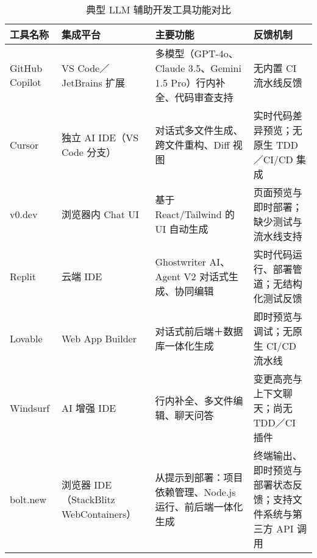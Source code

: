 \begin{table}[htbp]
  \centering
  \footnotesize
  \caption{典型 LLM 辅助开发工具功能对比}
  \label{tab:llm-tools-updated}
  \setlength{\tabcolsep}{3pt}
  \begin{tabular}{
    >{\raggedright\arraybackslash}p{2.4cm}
    >{\raggedright\arraybackslash}p{2.6cm}
    >{\raggedright\arraybackslash}p{3.6cm}
    >{\raggedright\arraybackslash}p{4.6cm}
  }
    \toprule
    \textbf{工具名称} & \textbf{集成平台} & \textbf{主要功能} & \textbf{反馈机制} \\
    \midrule
    GitHub Copilot\cite{copilotx2023}      & VS Code／JetBrains 扩展        & 多模型（GPT-4o、Claude 3.5、Gemini 1.5 Pro）行内补全、代码审查支持      & 无内置 CI 流水线反馈                                \\
    \addlinespace
    Cursor\cite{cursor2025wiki}            & 独立 AI IDE（VS Code 分支）    & 对话式多文件生成、跨文件重构、Diff 视图              & 实时代码差异预览；无原生 TDD／CI/CD 集成            \\
    \addlinespace
    v0.dev\cite{v0dev2024}                 & 浏览器内 Chat UI               & 基于 React/Tailwind 的 UI 自动生成                  & 页面预览与即时部署；缺少测试与流水线支持            \\
    \addlinespace
    Replit\cite{replit2025wiki}            & 云端 IDE                       & Ghostwriter AI、Agent V2 对话式生成、协同编辑       & 实时代码运行、部署管道；无结构化测试反馈            \\
    \addlinespace
    Lovable\cite{lovable2025times}         & Web App Builder                & 对话式前后端＋数据库一体化生成                      & 即时预览与调试；无原生 CI/CD 流水线                \\
    \addlinespace
    Windsurf\cite{windsurf2024}            & AI 增强 IDE                    & 行内补全、多文件编辑、聊天问答                      & 变更高亮与上下文聊天；尚无 TDD／CI 插件            \\
    \addlinespace
    bolt.new\cite{arunachalam2024boltnew,boltnewgithub2024} & 浏览器 IDE（StackBlitz WebContainers） & 从提示到部署：项目依赖管理、Node.js 运行、前后端一体化生成 & 终端输出、即时预览与部署状态反馈；支持文件系统与第三方 API 调用 \\
    \bottomrule
  \end{tabular}
\end{table}

